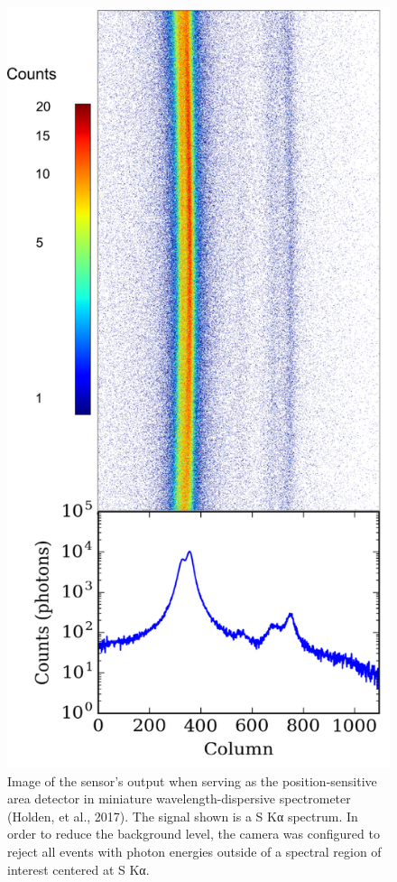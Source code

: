 \begin{figure}[h] \label{cmos27}
\caption{
Image of the sensor's output when serving as the
position-sensitive area detector in miniature wavelength-dispersive
spectrometer (Holden, et al., 2017). \cite{holden2017compact} The signal shown
is a S Kα spectrum. In order to reduce the background level, the camera
was configured to reject all events with photon energies outside of a
spectral region of interest centered at S Kα. \cite{holden2017compact}
}
\centering
\includegraphics{NewCameraPaper_1.10.docx1502867018/media/image7.png}
\end{figure}

